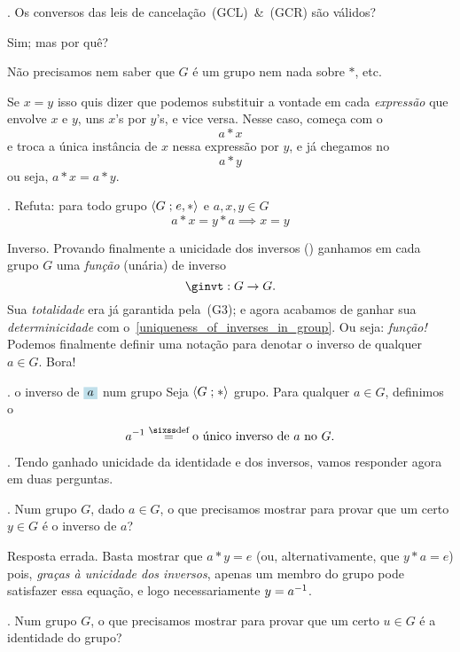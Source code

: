 \exercise.
\label{converses_of_cancellation_laws}%
Os conversos das leis de cancelação~(GCL)~\&~(GCR) são válidos?

\hint
Sim; mas por quê?

\hint
Não precisamos nem saber que $G$ é um grupo nem nada sobre $\ast$, etc.

\solution
Se $x=y$ isso quis dizer que podemos substituir a vontade em cada
\emph{expressão} que envolve $x$ e $y$, uns $x$'s por $y$'s, e vice versa.
Nesse caso, começa com o
$$
a \ast x
$$
e troca a única instância de $x$ nessa expressão por $y$, e já chegamos no
$$
a \ast y
$$
ou seja, $a \ast x = a \ast y$.

\endexercise

\exercise.
Refuta: para todo grupo $\langle{G}\mathrel{;}{e, \ast}\rangle$ e $a,x,y\in G$
$$
a\ast x = y\ast a \implies x=y
$$

\endexercise

\note Inverso.
\label{ginv_is_a_function}%
Provando finalmente a unicidade dos inversos
() ganhamos em cada grupo $G$ uma
\emph{função} (unária) de inverso
$$
\ginvt : G \to G.
$$
Sua \emph{totalidade} era já garantida pela~(G3);
e agora acabamos de ganhar sua \emph{determinicidade} com
o~\ref{uniqueness_of_inverses_in_group}.
Ou seja: \emph{função!}
Podemos finalmente definir uma notação para denotar o inverso de qualquer $a\in G$.
Bora!

.
\label{ginv}%
 {o inverso de $\holed a$ num grupo}
Seja $\langle{G}\mathrel{;}{\ast}\rangle$ grupo.  Para qualquer $a\in G$, definimos o
$$
\ginv a \defeq \text{o único inverso de $a$ no $G$}.
$$

\blah.
Tendo ganhado unicidade da identidade e dos inversos,
vamos responder agora em duas perguntas.

.
Num grupo $G$, dado $a\in G$,
o que precisamos mostrar para provar que um certo $y\in G$ é o inverso de $a$?

\note Resposta errada.
Basta mostrar que $a \ast y = e$
(ou, alternativamente, que $y \ast a = e$)
pois, \emph{graças à unicidade dos inversos},
apenas um membro do grupo pode satisfazer essa equação,
e logo necessariamente $y = {a}^{-1}$.

.
Num grupo $G$, o que precisamos mostrar para provar que um certo $u\in G$ é a identidade do grupo?

